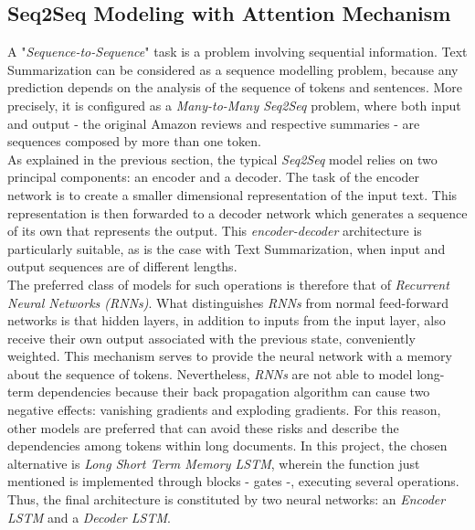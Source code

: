 \documentclass[fleqn,10pt]{SelfArx} %
\begin{document}
\subsection{Seq2Seq Modeling with Attention Mechanism}
A "\textit{Sequence-to-Sequence}" task is a problem involving sequential information. Text Summarization can be considered as a sequence modelling problem, because any prediction depends on the analysis of the sequence of tokens and sentences. More precisely, it is configured as a \textit{Many-to-Many Seq2Seq} problem, where both input and output - the original Amazon reviews and respective summaries - are sequences composed by more than one token.\\
As explained in the previous section, the typical \textit{Seq2Seq} model relies on two principal components: an encoder and a decoder. The task of the encoder network is to create a smaller dimensional representation of the input text. This representation is then forwarded to a decoder network which generates a sequence of its own that represents the output. This \textit{encoder-decoder} architecture is particularly suitable, as is the case with Text Summarization, when input and output sequences are of different lengths.\\
The preferred class of models for such operations is therefore that of \textit{Recurrent Neural Networks (RNNs)}. What distinguishes \textit{RNNs} from normal feed-forward networks is that hidden layers, in addition to inputs from the input layer, also receive their own output associated with the previous state, conveniently weighted. This mechanism serves to provide the neural network with a memory about the sequence of tokens. Nevertheless, \textit{RNNs} are not able to model long-term dependencies because their back propagation algorithm can cause two negative effects: vanishing gradients and exploding gradients. For this reason, other models are preferred that can avoid these risks and describe the dependencies among tokens within long documents. In this project, the chosen alternative is \textit{Long Short Term Memory LSTM}, wherein the function just mentioned is implemented through blocks - gates -, executing several operations.\\ Thus, the final architecture is constituted by two neural networks: an \textit{Encoder LSTM} and a \textit{Decoder LSTM}.
\end{document}
